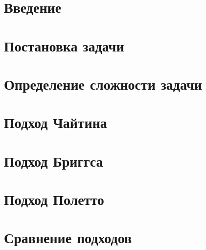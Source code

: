 



\section{Введение}



\section{Постановка задачи}



\section{Определение сложности задачи} %

\label{seg:complexity}



\section{Подход Чайтина}



\section{Подход Бриггса}



\section{Подход Полетто}



\section{Сравнение подходов}



{}




